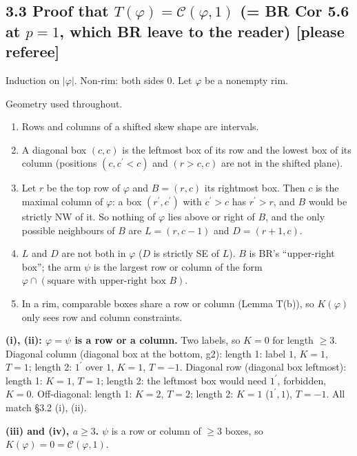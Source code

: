 \documentclass[10pt]{amsart}
\newcommand{\cC}{\mathcal{C}}
\newcommand{\pr}{^{\prime}}
\theoremstyle{remark}
\begin{document}
\subsection*{3.3 Proof that $T(\varphi)=\cC(\varphi,1)$ (= BR Cor 5.6 at $p=1$, which BR leave to the reader)
\quad\textbf{[please referee]}}

Induction on $|\varphi|$. Non-rim: both sides $0$. Let $\varphi$ be a nonempty rim.

Geometry used throughout.
\begin{enumerate}[label=(g\arabic*)]
\item Rows and columns of a shifted skew shape are intervals.
\item A diagonal box $(c,c)$ is the leftmost box of its row and the lowest box of its column (positions $(c,c\pr<c)$ and
$(r>c,c)$ are not in the shifted plane).
\item Let $r$ be the top row of $\varphi$ and $B=(r,c)$ its rightmost box. Then $c$ is the maximal column of $\varphi$: a box
$(r\pr,c\pr)$ with $c\pr>c$ has $r\pr>r$, and $B$ would be strictly NW of it. So nothing of $\varphi$ lies above or right of
$B$, and the only possible neighbours of $B$ are $L=(r,c-1)$ and $D=(r+1,c)$.
\item $L$ and $D$ are not both in $\varphi$ ($D$ is strictly SE of $L$). $B$ is BR's ``upper-right box''; the arm $\psi$ is
the largest row or column of the form $\varphi\cap(\text{square with upper-right box }B)$.
\item In a rim, comparable boxes share a row or column (Lemma T(b)), so $K(\varphi)$ only sees row and column constraints.
\end{enumerate}

\textbf{(i), (ii): $\varphi=\psi$ is a row or a column.} Two labels, so $K=0$ for length $\ge3$. Diagonal column (diagonal
box at the bottom, g2): length 1: label $1$, $K=1$, $T=1$; length 2: $1\pr$ over $1$, $K=1$, $T=-1$. Diagonal row (diagonal
box leftmost): length 1: $K=1$, $T=1$; length 2: the leftmost box would need $1\pr$, forbidden, $K=0$. Off-diagonal:
length 1: $K=2$, $T=2$; length 2: $K=1$ ($1\pr,1$), $T=-1$. All match \S3.2 (i), (ii).

\textbf{(iii) and (iv), $a\ge3$.} $\psi$ is a row or column of $\ge3$ boxes, so $K(\varphi)=0=\cC(\varphi,1)$.
\end{document}
